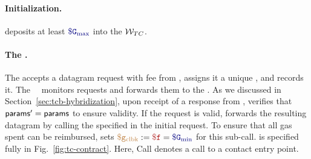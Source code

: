 \paragraph{Initialization.}
\tc deposits at least $\constgasmax$ into the $\tcadd$.

\paragraph{The \tcontract \tcont.}
The \tcontract accepts a datagram request with fee \fee from \reqcont, assigns it a unique \dgid, and records it.
The \tcs\ \medname\ \relay monitors requests and forwards them to the \encname.
As we discussed in Section~\ref{sec:tcb-hybridization}, upon receipt of a response from \tcadd, \tcont verifies that ${\sf params}' = {\sf params}$ to ensure validity.
If the request is valid, \tcont forwards the resulting datagram \dgm by calling the \dgcallback specified in the initial request.
To ensure that all gas spent can be reimbursed, \tcont sets $\gascallback := \fee = \constgasmin$ for this sub-call.
\tcont is specified fully in Fig.~\ref{fig:tc-contract}. Here, Call denotes a call to a contact entry point. 

